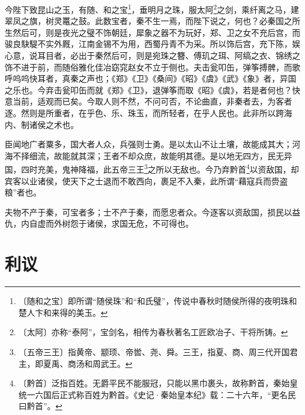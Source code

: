 \documentclass[12pt,UTF-8,openany]{ctexbook}
\begin{document}
\begin{normalsize}
    今陛下致昆山之玉，有随、和之宝\footnote{〔随和之宝〕即所谓“随侯珠”和“和氏璧”，传说中春秋时随侯所得的夜明珠和楚人卞和来得的美玉。}，垂明月之珠，服太阿\footnote{〔太阿〕亦称“泰阿”，宝剑名，相传为春秋著名工匠欧冶子、干将所铸。}之剑，乘纤离之马，建翠凤之旗，树灵鼍之鼓。此数宝者，秦不生一焉，而陛下说之，何也？必秦国之所生然后可，则是夜光之璧不饰朝廷，犀象之器不为玩好，郑、卫之女不充后宫，而骏良駃騠不实外厩，江南金锡不为用，西蜀丹青不为采。所以饰后宫，充下陈，娱心意，说耳目者，必出于秦然后可，则是宛珠之簪、傅玑之珥、阿缟之衣、锦绣之饰不进于前，而随俗雅化佳冶窈窕赵女不立于侧也。夫击瓮叩缶，弹筝搏髀，而歌呼呜呜快耳者，真秦之声也；《郑》《卫》《桑间》《昭》《虞》《武》《象》者，异国之乐也。今弃击瓮叩缶而就《郑》《卫》，退弹筝而取《昭》《虞》，若是者何也？快意当前，适观而已矣。今取人则不然，不问可否，不论曲直，非秦者去，为客者逐。然则是所重者，在乎色、乐、珠玉，而所轻者，在乎人民也。此非所以跨海内、制诸侯之术也。
    
    臣闻地广者粟多，国大者人众，兵强则士勇。是以太山不让土壤，故能成其大；河海不择细流，故能就其深；王者不却众庶，故能明其德。是以地无四方，民无异国，四时充美，鬼神降福，此五帝三王\footnote{〔五帝三王〕指黄帝、颛顼、帝喾、尧、舜。三王，指夏、商、周三代开国君主，即夏禹、商汤和周武王。}之所以无敌也。今乃弃黔首\footnote{〔黔首〕泛指百姓。无爵平民不能服冠，只能以黑巾裹头，故称黔首，秦始皇统一六国后正式称百姓为黔首。《史记·秦始皇本纪》载：二十六年，“更名民曰黔首”。}以资敌国，却宾客以业诸侯，使天下之士退而不敢西向，裹足不入秦，此所谓“藉寇兵而赍盗粮”者也。
    
    夫物不产于秦，可宝者多；士不产于秦，而愿忠者众。今逐客以资敌国，损民以益仇，内自虚而外树怨于诸侯，求国无危，不可得也。
\end{normalsize}



\chapter{利议}
\end{document}
